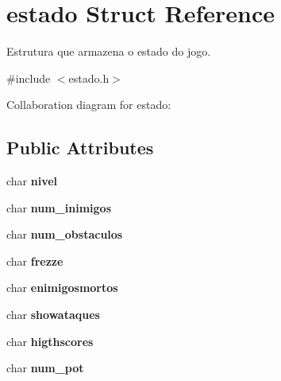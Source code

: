 \hypertarget{structestado}{}\section{estado Struct Reference}
\label{structestado}


Estrutura que armazena o estado do jogo.  




{\ttfamily \#include $<$estado.\+h$>$}



Collaboration diagram for estado\+:
\subsection*{Public Attributes}
\begin{DoxyCompactItemize}
\item 
char {\bfseries nivel}\hypertarget{structestado_a620f2f81ebfe4cba1d6e44b09a1762f7}{}\label{structestado_a620f2f81ebfe4cba1d6e44b09a1762f7}

\item 
char {\bfseries num\+\_\+inimigos}\hypertarget{structestado_a6fbc4a80c4f371036f264ecfe27e5f9e}{}\label{structestado_a6fbc4a80c4f371036f264ecfe27e5f9e}

\item 
char {\bfseries num\+\_\+obstaculos}\hypertarget{structestado_ac1a8a541e2301189833c6f713c416063}{}\label{structestado_ac1a8a541e2301189833c6f713c416063}

\item 
char {\bfseries frezze}\hypertarget{structestado_ae960fb7e2f961016ec3784588b18c6d1}{}\label{structestado_ae960fb7e2f961016ec3784588b18c6d1}

\item 
char {\bfseries enimigosmortos}\hypertarget{structestado_aa30ae888a617754fff6994a7037a1ab3}{}\label{structestado_aa30ae888a617754fff6994a7037a1ab3}

\item 
char {\bfseries showataques}\hypertarget{structestado_a72cfbaf226d9a3262486d7b802030ce9}{}\label{structestado_a72cfbaf226d9a3262486d7b802030ce9}

\item 
char {\bfseries higthscores}\hypertarget{structestado_af4c2f379bea14fbfa440717e36e74fb9}{}\label{structestado_af4c2f379bea14fbfa440717e36e74fb9}

\item 
char {\bfseries num\+\_\+pot}\hypertarget{structestado_ab84672aacf9cf9fff245eabe167b29da}{}\label{structestado_ab84672aacf9cf9fff245eabe167b29da}


\end{DoxyCompactItemize}
